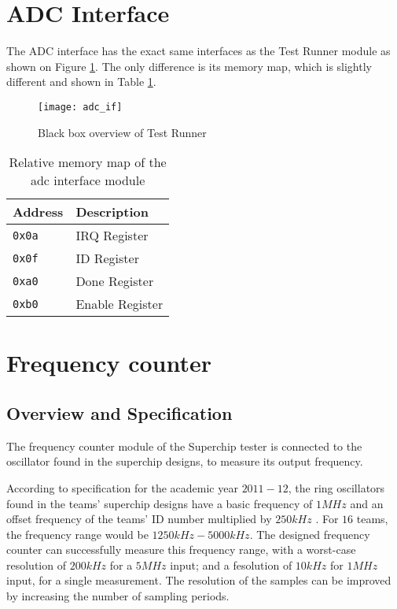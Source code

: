 \newpage
\section{ADC Interface}
The ADC interface has the exact same interfaces as the Test Runner module as shown
on Figure \ref{figure:adc_if_blackbox}. The only difference is its memory map, which is slightly different
and shown in Table \ref{table:adc_memorymap}.

\begin{figure}[h!]
\begin{center}
\texttt{[image: adc\_if]}
\caption{Black box overview of Test Runner}
\label{figure:adc_if_blackbox}
\end{center}
\end{figure}

\begin{table}[h!]
\centering
\begin{tabular}{ | l | l | }
 \hline
   Address       & Description \\
 \hline
   \texttt{0x0a} & IRQ Register \\
 \hline
   \texttt{0x0f} & ID Register \\
 \hline
   \texttt{0xa0} & Done Register \\
 \hline
   \texttt{0xb0} & Enable Register \\
 \hline
\end{tabular}
\caption{Relative memory map of the adc interface module}
\label{table:adc_memorymap}
\end{table}


\newpage
\section{Frequency counter}

\subsection{Overview and Specification}

The frequency counter module of the Superchip tester is connected to the oscillator found in the superchip designs, to measure its output frequency.

According to specification for the academic year $2011-12$, the ring oscillators found in the teams' superchip designs have a basic frequency of $1MHz$ and an offset frequency of the teams' ID number multiplied by $250kHz$ \citep{Southampton:2011:spec}. For $16$ teams, the frequency range would be $1250kHz - 5000kHz$. The designed frequency counter can successfully measure this frequency range, with a worst-case resolution of $200kHz$ for a $5MHz$ input; and a fesolution of $10kHz$ for $1MHz$ input, for a single measurement. The resolution of the samples can be improved by increasing the number of sampling periods.


